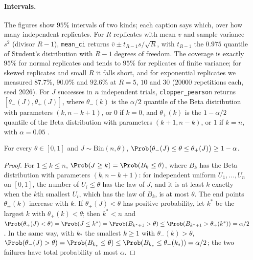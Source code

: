 \begin{refsection}
\paragraph{Intervals.} The figures show $95\%$ intervals of two kinds; each caption says which, over how many independent replicates. For $R$ replicates with mean $\bar v$ and sample variance $s^2$ (divisor $R-1$), \texttt{mean\_ci} returns $\bar v\pm t_{R-1}s/\sqrt R$, with $t_{R-1}$ the $0.975$ quantile of Student's distribution with $R-1$ degrees of freedom. The coverage is exactly $95\%$ for normal replicates and tends to $95\%$ for replicates of finite variance; for skewed replicates and small $R$ it falls short, and for exponential replicates we measured $87.7\%$, $90.0\%$ and $92.6\%$ at $R=5$, $10$ and $30$ ($20000$ repetitions each, seed 2026). For $J$ successes in $n$ independent trials, \texttt{clopper\_\allowbreak pearson} returns $[\theta_-(J),\theta_+(J)]$, where $\theta_-(k)$ is the $\alpha/2$ quantile of the Beta distribution with parameters $(k,n-k+1)$, or $0$ if $k=0$, and $\theta_+(k)$ is the $1-\alpha/2$ quantile of the Beta distribution with parameters $(k+1,n-k)$, or $1$ if $k=n$, with $\alpha=0.05$ \parencite{ClopperPearson1934}.

\begin{proposition}\label{prop:toolkit:clopper}
For every $\theta\in[0,1]$ and $J\sim\mathrm{Bin}(n,\theta)$, $\Prob\bigl(\theta_-(J)\le\theta\le\theta_+(J)\bigr)\ge1-\alpha$.
\end{proposition}

\begin{proof}
For $1\le k\le n$, $\Prob(J\ge k)=\Prob(B_k\le\theta)$, where $B_k$ has the Beta distribution with parameters $(k,n-k+1)$: for independent uniform $U_1,\dots,U_n$ on $[0,1]$, the number of $U_i\le\theta$ has the law of $J$, and it is at least $k$ exactly when the $k$th smallest $U_i$, which has the law of $B_k$, is at most $\theta$. The end points $\theta_\pm(k)$ increase with $k$. If $\theta_+(J)<\theta$ has positive probability, let $k^*$ be the largest $k$ with $\theta_+(k)<\theta$; then $k^*<n$ and $\Prob(\theta_+(J)<\theta)=\Prob(J\le k^*)=\Prob(B_{k^*+1}>\theta)\le\Prob(B_{k^*+1}>\theta_+(k^*))=\alpha/2$. In the same way, with $k_*$ the smallest $k\ge1$ with $\theta_-(k)>\theta$, $\Prob(\theta_-(J)>\theta)=\Prob(B_{k_*}\le\theta)\le\Prob(B_{k_*}\le\theta_-(k_*))=\alpha/2$; the two failures have total probability at most $\alpha$.
\end{proof}


\end{refsection}
